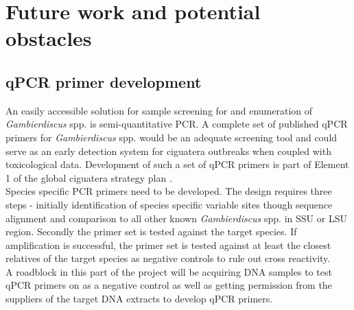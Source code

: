\documentclass[12pt]{article}
\begin{document}







\section{Future work and potential obstacles}

\subsection{qPCR primer development}
An easily accessible solution for sample screening for and enumeration of \emph{Gambierdiscus} spp. is  semi-quantitative PCR. A complete set of published qPCR primers for \emph{Gambierdiscus} spp. would be an adequate screening tool and could serve as an early detection system for ciguatera outbreaks when coupled with toxicological data. Development of such a set of qPCR primers is part of Element 1 of the global ciguatera strategy plan \cite{globalcig}. \\
Species specific PCR primers need to be developed. The design requires three steps - initially identification of species specific variable sites though sequence alignment and comparison to all other known \emph{Gambierdiscus} spp. in SSU or LSU region. Secondly the primer set is tested against the target species. If amplification is successful, the primer set is tested against at least the closest relatives of the target species as negative controls to rule out cross reactivity. \\
A roadblock in this part of the project will be acquiring DNA samples to test qPCR primers on as a negative control as well as getting permission from the suppliers of the target DNA extracts to develop qPCR primers.
\end{document}
